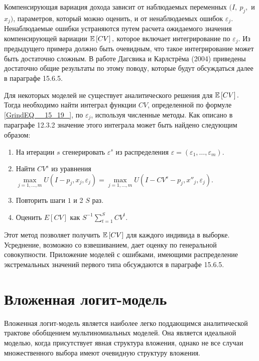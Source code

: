 Компенсирующая вариация дохода зависит от наблюдаемых переменных $(I,\ p_j,$ и $x_j)$,  параметров, который можно оценить, и от ненаблюдаемых ошибок ${\varepsilon }_j.$ Ненаблюдаемые ошибки устраняются путем расчета ожидаемого значения компенсирующей вариации $\mathbb{E}\left[CV\right],$ которое включает интегрирование по ${\varepsilon }_j$. Из предыдущего примера должно быть очевидным, что такое интегрирование может быть достаточно сложным. В работе Дагсвика и Карлстрёма (2004) приведены достаточно общие результаты по этому поводу, которые будут обсуждаться далее в параграфе 15.6.5.

Для некоторых моделей не существует аналитического решения для $\mathbb{E}\left[CV\right].$ Тогда необходимо найти интеграл функции $CV$, определенной по формуле \eqref{GrindEQ__15_19_}, по ${\varepsilon }_j$, используя численные методы. Как описано в параграфе 12.3.2 значение этого интеграла может быть найдено следующим образом:

\begin{enumerate}
\item  На итерации $s$ сгенерировать ${\varepsilon }^s$ из распределения $\varepsilon =\left({\varepsilon }_1,\dots ,{\varepsilon }_m\right).$

\item  Найти $CV^s$ из уравнения $\underset{j=1,\dots ,m}{\max } 
U\left(I-p_j,x_j,{\varepsilon }_j\right)=
\underset{j=1,\dots ,m}{\max } U\left(I-CV^s-p_j,x''_j,{\varepsilon }_j\right).\ $

\item  Повторить шаги $1$ и 2 $S$ раз.

\item  Оценить $E[CV]$ как $S^{-1}\sum^S_{t=1}{CV^t}.$
\end{enumerate}

Этот метод позволяет получить $\mathbb{E}\left[CV\right]$ для каждого индивида в выборке. Усреднение, возможно со взвешиванием, дает оценку по генеральной совокупности. Приложение моделей с ошибками, имеющими распределение экстремальных значений первого типа обсуждаются в параграфе 15.6.5.

\section{Вложенная логит-модель}

Вложенная логит-модель является наиболее легко поддающимся аналитической трактове обобщением мультиномиальных моделей. Она является идеальной моделью, когда присутствует явная структура вложения, однако не все случаи множественного выбора имеют очевидную структуру вложения. 

